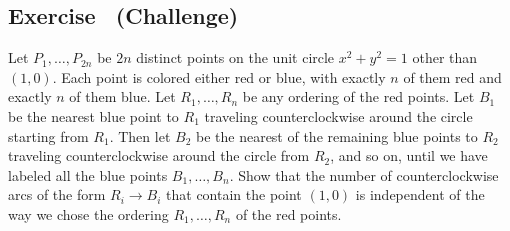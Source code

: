 \documentclass{article}
\newcounter{counter}
\newcommand{\Exercise}{Exercise \stepcounter{counter}\thecounter}
\begin{document}


\subsection*{\Exercise \ (Challenge)}
    Let $P_1, \ldots, P_{2n}$ be $2n$ distinct points on the unit circle $x^2 + y^2 = 1$ other than $(1,0)$. Each point is colored either red or blue, with exactly $n$ of them red and exactly $n$ of them blue. Let $R_1, \ldots, R_n$ be any ordering of the red points. Let $B_1$ be the nearest blue point to $R_1$ traveling counterclockwise around the circle starting from $R_1$. Then let $B_2$ be the nearest of the remaining blue points to $R_2$ traveling counterclockwise around the circle from $R_2$, and so on, until we have labeled all the blue points $B_1, \ldots, B_n$. Show that the number of counterclockwise arcs of the form $R_i \rightarrow B_i$ that contain the point $(1,0)$ is independent of the way we chose the ordering $R_1, \ldots, R_n$ of the red points.





\end{document}
